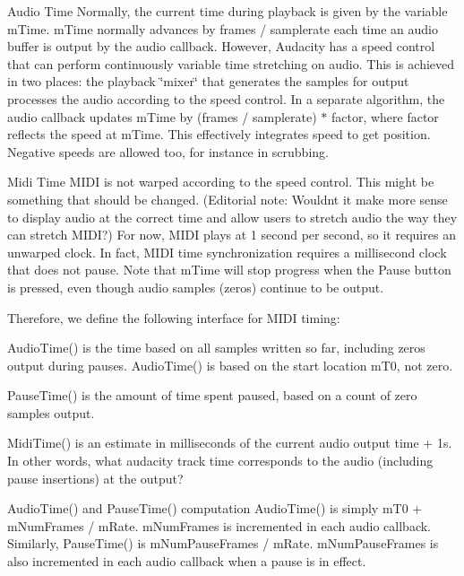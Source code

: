 \begin{DoxyParagraph}{Audio Time}
Normally, the current time during playback is given by the variable m\+Time. m\+Time normally advances by frames / samplerate each time an audio buffer is output by the audio callback. However, Audacity has a speed control that can perform continuously variable time stretching on audio. This is achieved in two places\+: the playback \char`\"{}mixer\char`\"{} that generates the samples for output processes the audio according to the speed control. In a separate algorithm, the audio callback updates m\+Time by (frames / samplerate) $\ast$ factor, where factor reflects the speed at m\+Time. This effectively integrates speed to get position. Negative speeds are allowed too, for instance in scrubbing.
\end{DoxyParagraph}
\begin{DoxyParagraph}{Midi Time}
M\+I\+DI is not warped according to the speed control. This might be something that should be changed. (Editorial note\+: Wouldn\textquotesingle{}t it make more sense to display audio at the correct time and allow users to stretch audio the way they can stretch M\+I\+DI?) For now, M\+I\+DI plays at 1 second per second, so it requires an unwarped clock. In fact, M\+I\+DI time synchronization requires a millisecond clock that does not pause. Note that m\+Time will stop progress when the Pause button is pressed, even though audio samples (zeros) continue to be output.
\end{DoxyParagraph}
\begin{DoxyParagraph}{}
Therefore, we define the following interface for M\+I\+DI timing\+: \begin{DoxyItemize}
\item {\ttfamily Audio\+Time()} is the time based on all samples written so far, including zeros output during pauses. Audio\+Time() is based on the start location m\+T0, not zero. \item {\ttfamily Pause\+Time()} is the amount of time spent paused, based on a count of zero samples output. \item {\ttfamily Midi\+Time()} is an estimate in milliseconds of the current audio output time + 1s. In other words, what audacity track time corresponds to the audio (including pause insertions) at the output?\end{DoxyItemize}

\end{DoxyParagraph}
\begin{DoxyParagraph}{Audio\+Time() and Pause\+Time() computation}
Audio\+Time() is simply m\+T0 + m\+Num\+Frames / m\+Rate. m\+Num\+Frames is incremented in each audio callback. Similarly, Pause\+Time() is m\+Num\+Pause\+Frames / m\+Rate. m\+Num\+Pause\+Frames is also incremented in each audio callback when a pause is in effect.
\end{DoxyParagraph}
